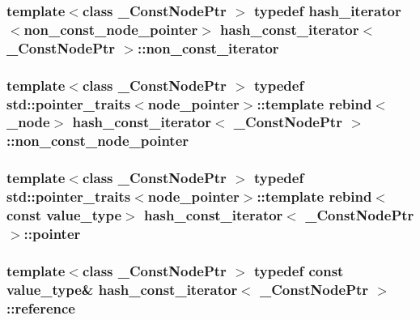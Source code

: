 \subsubsection[{non\+\_\+const\+\_\+iterator}]{\setlength{\rightskip}{0pt plus 5cm}template$<$class \+\_\+\+Const\+Node\+Ptr $>$ typedef {\bf hash\+\_\+iterator}$<${\bf non\+\_\+const\+\_\+node\+\_\+pointer}$>$ {\bf hash\+\_\+const\+\_\+iterator}$<$ \+\_\+\+Const\+Node\+Ptr $>$\+::{\bf non\+\_\+const\+\_\+iterator}}\label{classhash__const__iterator_ab4441e734185e334b2b02f49f83af048}
\hypertarget{classhash__const__iterator_a0c858fd44628d6f0ddf88c629e4bea7f}{}
\subsubsection[{non\+\_\+const\+\_\+node\+\_\+pointer}]{\setlength{\rightskip}{0pt plus 5cm}template$<$class \+\_\+\+Const\+Node\+Ptr $>$ typedef std\+::pointer\+\_\+traits$<$node\+\_\+pointer$>$\+::template rebind$<$\+\_\+node$>$ {\bf hash\+\_\+const\+\_\+iterator}$<$ \+\_\+\+Const\+Node\+Ptr $>$\+::{\bf non\+\_\+const\+\_\+node\+\_\+pointer}}\label{classhash__const__iterator_a0c858fd44628d6f0ddf88c629e4bea7f}
\hypertarget{classhash__const__iterator_a3a6d2d49ab869df674b9b0e828117fe4}{}
\subsubsection[{pointer}]{\setlength{\rightskip}{0pt plus 5cm}template$<$class \+\_\+\+Const\+Node\+Ptr $>$ typedef std\+::pointer\+\_\+traits$<$node\+\_\+pointer$>$\+::template rebind$<$const {\bf value\+\_\+type}$>$ {\bf hash\+\_\+const\+\_\+iterator}$<$ \+\_\+\+Const\+Node\+Ptr $>$\+::{\bf pointer}}\label{classhash__const__iterator_a3a6d2d49ab869df674b9b0e828117fe4}
\hypertarget{classhash__const__iterator_a9634442043c96c628889101cc7e5639d}{}
\subsubsection[{reference}]{\setlength{\rightskip}{0pt plus 5cm}template$<$class \+\_\+\+Const\+Node\+Ptr $>$ typedef const {\bf value\+\_\+type}\& {\bf hash\+\_\+const\+\_\+iterator}$<$ \+\_\+\+Const\+Node\+Ptr $>$\+::{\bf reference}}\label{classhash__const__iterator_a9634442043c96c628889101cc7e5639d}
\hypertarget{classhash__const__iterator_a116458588698b7c3ab105dd581c8d666}{}
